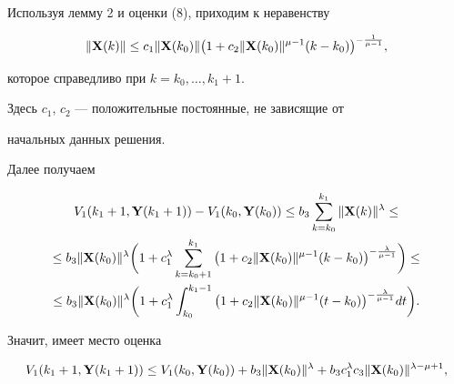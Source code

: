 \begin{pf}
Используя лемму 2 и оценки (8), приходим к неравенству


\begin{equation}


\|\bold X(k)\| \leq c_1 \|\bold X(k_0)\| \big(1+c_2


\|\bold X(k_0)\|^{\mu-1} (k-k_0)\big)^{-\frac1{\mu-1}},


\end{equation}


которое справедливо при $k=k_0,\dotsc,k_1+1$.


Здесь $c_1$, $c_2$ --- положительные постоянные, не зависящие от


начальных данных решения.





Далее получаем


\begin{gather*}


V_1(k_1+1, \bold Y(k_1+1)) - V_1(k_0, \bold Y(k_0))\leq


b_3 \sum_{k=k_0}^{k_1} \|\bold X(k)\|^\lambda\leq \\


%


\leq b_3 \|\bold X(k_0)\|^\lambda \bigg(1+c^\lambda_1


\sum_{k=k_0+1}^{k_1} \big(1+c_2


\|\bold X(k_0)\|^{\mu-1}(k-k_0)\big)^{-\frac\lambda{\mu-1}}\bigg)\leq \\


%


\leq b_3 \|\bold X(k_0)\|^\lambda \bigg(1+


c^\lambda_1 \int_{k_0}^{k_1-1} \big(1+c_2


\|\bold X(k_0)\|^{\mu-1} (t-k_0)\big)^{-\frac\lambda{\mu-1}} dt \bigg).


\end{gather*}





Значит, имеет место оценка


\begin{equation}


V_1(k_1+1, \bold Y(k_1+1)) \leq V_1(k_0, \bold Y(k_0)) +


b_3 \|\bold X(k_0)\|^\lambda+b_3 c^\lambda_1 c_3 


\|\bold X(k_0)\|^{\lambda-\mu+1},


\end{equation}



\end{pf}
